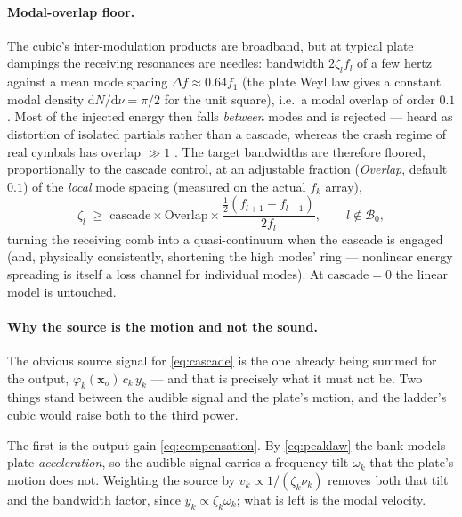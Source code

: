 \documentclass[11pt,a4paper]{article}
\newcommand{\dd}{\mathrm{d}}
\begin{document}
\paragraph{Modal-overlap floor.}
The cubic's inter-modulation products are broadband, but at typical plate
dampings the receiving resonances are needles: bandwidth $2\zeta_l f_l$ of
a few hertz against a mean mode spacing $\Delta f \approx 0.64 f_1$ (the
plate Weyl law gives a constant modal density $\dd N/\dd\nu = \pi/2$ for
the unit square), i.e.\ a modal overlap of order $0.1$. Most of the
injected energy then falls \emph{between} modes and is rejected --- heard
as distortion of isolated partials rather than a cascade, whereas the
crash regime of real cymbals has overlap $\gg 1$ \cite{fletcher-rossing}.
The target bandwidths are therefore floored, proportionally to the cascade
control, at an adjustable fraction (\emph{Overlap}, default $0.1$) of the
\emph{local} mode spacing (measured on the actual $f_k$ array),
%
\begin{equation}
  \zeta_l \;\ge\; \mathrm{cascade} \times \mathrm{Overlap} \times
      \frac{\tfrac12 (f_{l+1} - f_{l-1})}{2 f_l},
  \qquad l \notin \mathcal{B}_0,
  \label{eq:overlap}
\end{equation}
%
turning the receiving comb into a quasi-continuum when the cascade is
engaged (and, physically consistently, shortening the high modes' ring ---
nonlinear energy spreading is itself a loss channel for individual modes).
At $\mathrm{cascade}=0$ the linear model is untouched.

\paragraph{Why the source is the motion and not the sound.}
\label{par:drive}
The obvious source signal for \eqref{eq:cascade} is the one already being
summed for the output, $\varphi_k(\bm{x}_o)\,c_k\,y_k$ --- and that is
precisely what it must not be. Two things stand between the audible signal
and the plate's motion, and the ladder's cubic would raise both to the
third power.

The first is the output gain
\eqref{eq:compensation}. By \eqref{eq:peaklaw} the bank models plate
\emph{acceleration}, so the audible signal carries a frequency tilt
$\omega_k$ that the plate's motion does not. Weighting the source by
$v_k \propto 1/(\zeta_k\nu_k)$ removes both that tilt and the bandwidth
factor, since $y_k \propto \zeta_k\omega_k$; what is left is the modal
velocity.
\end{document}

